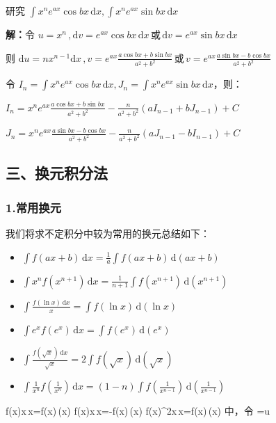 \begin{corollary}{}
研究 $\displaystyle{\int x^n e^{ax}\cos bx\,\mathrm{d}x,\int x^n e^{ax}\sin bx\,\mathrm {d}x}$

\textbf{解：}令 $\displaystyle{u=x^n\,,\mathrm{d}v=e^{ax}\cos{bx}\,\mathrm{d}x\,\text{或}\,\mathrm{d}v=e^{ax}\sin{bx}\,\mathrm{d}x}$

则 $\displaystyle{\mathrm{d}u=nx^{n-1}\mathrm{d}x\,,v=e^{ax}\frac{a\cos bx+b\sin bx}{a^2+b^2}\,\text{或}\,v=e^{ax}\frac{a\sin bx-b\cos bx}{a^2+b^2}}$

令 $\displaystyle{I_n=\int x^n e^{ax}\cos bx\,\mathrm{d}x},J_n=\int x^n e^{ax}\sin bx\,\mathrm{d}x$，则：

$\displaystyle{I_n=x^n e^{ax}\frac{{a\cos bx+b\sin bx}}{a^2+b^2}-\frac{n}{a^2+b^2}\left(aI_{n-1}+bJ_{n-1}\right)+C}$

$\displaystyle{J_n=x^n e^{ax}\frac{{a\sin bx-b\cos bx}}{a^2+b^2}-\frac{n}{a^2+b^2}\left(aJ_{n-1}-bI_{n-1}\right)+C}$ 
\end{corollary}
\subsection{三、换元积分法}
\subsubsection{1.常用换元}
我们将求不定积分中较为常用的换元总结如下：
\begin{itemize}
\item $\displaystyle{\int f(ax+b)\,\mathrm{d}x=\frac{1}{a}\int f(ax+b)\,\mathrm{d}\left(ax+b\right)}$
\end{itemize}
\begin{itemize}
\item $\displaystyle{\int x^nf(x^{n+1})\,\mathrm{d}x=\frac{1}{n+1}\int f(x^{n+1})\,\mathrm{d}(x^{n+1})}$
\end{itemize} 
\begin{itemize}
\item $\displaystyle{\int \frac{f(\ln x)\,\mathrm{d}x}{x}=\int f(\ln x)\,\mathrm{d}(\ln x)}$ 
\end{itemize}
\begin{itemize}
\item $\displaystyle{\int e^xf(e^x)\,\mathrm{d}x=\int f(e^x)\,\mathrm{d}(e^x)}$ 
\end{itemize}
\begin{itemize}
\item $\displaystyle{\int \frac{f(\sqrt{x})\,\mathrm{d}x}{\sqrt{x}}=2\int f(\sqrt{x})\,\mathrm{d}(\sqrt{x})}$
\end{itemize} 
\begin{itemize}
\item $\displaystyle{\int \frac{1}{x^n}f\left(\frac{1}{x^n}\right)\,\mathrm{d}x=(1-n)\int f\left(\frac{1}{x^{n-1}}\right)\,\mathrm{d}\left(\frac{1}{x^{n-1}}\right)}$ 
\end{itemize}
\int f(\sin x)\cos x\,x=\int f(\sin x)\,(\sin x) 
\int f(\cos x)\sin x\,x=-\int f(\cos x)\,(\cos x) 
\int f(\tan x)\sec^2x\,x=\int f(\tan x)\,(\tan x) 
 中，令 =u 
